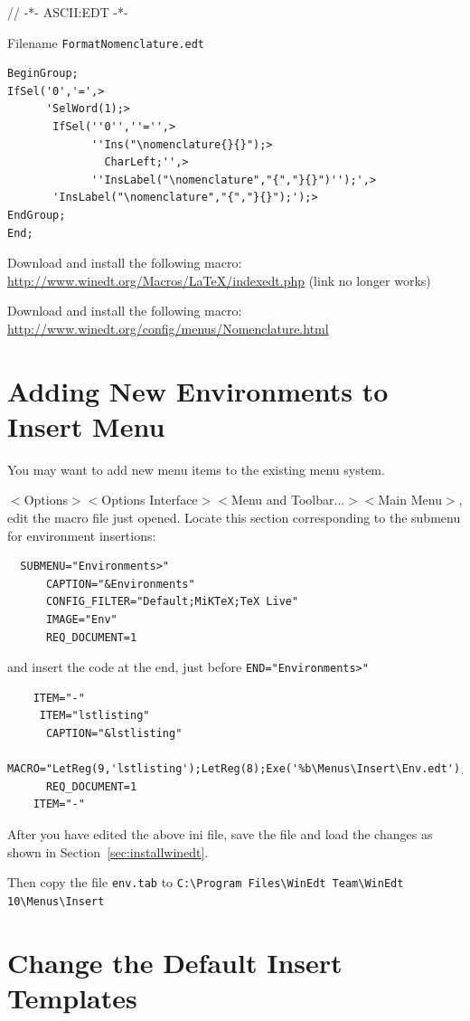 // -*- ASCII:EDT -*-

Filename \texttt{FormatNomenclature.edt}
\begin{lstlisting}
BeginGroup;
IfSel('0','=',>
      'SelWord(1);>
       IfSel(''0'',''='',>
             ''Ins("\nomenclature{}{}");>
               CharLeft;'',>
             ''InsLabel("\nomenclature","{","}{}")'');',>
       'InsLabel("\nomenclature","{","}{}");');>
EndGroup;
End;
\end{lstlisting}



Download and install the following macro:\\
\url{http://www.winedt.org/Macros/LaTeX/indexedt.php} (link no longer works)

Download and install the following macro:\\
\url{http://www.winedt.org/config/menus/Nomenclature.html}

\section{Adding New Environments to Insert Menu}

You may want to add new menu items to the existing menu system.

$<$Options$>$$<$Options Interface$>$$<$Menu and Toolbar...$>$$<$Main Menu$>$, edit the macro file just opened. Locate this section corresponding to the submenu for environment insertions:

\begin{lstlisting}
  SUBMENU="Environments>"
      CAPTION="&Environments"
      CONFIG_FILTER="Default;MiKTeX;TeX Live"
      IMAGE="Env"
      REQ_DOCUMENT=1
\end{lstlisting}

and insert the code at the end, just before   \verb+END="Environments>"+

\begin{lstlisting}
    ITEM="-"
     ITEM="lstlisting"
      CAPTION="&lstlisting"
      MACRO="LetReg(9,'lstlisting');LetReg(8);Exe('%b\Menus\Insert\Env.edt');"
      REQ_DOCUMENT=1
    ITEM="-"
\end{lstlisting}

After you have edited the above ini file, save the file and load the changes as shown in Section~\ref{sec:installwinedt}.

Then copy the file \verb+env.tab+ to 
\verb+C:\Program Files\WinEdt Team\WinEdt 10\Menus\Insert+

\section{Change the Default Insert Templates}

